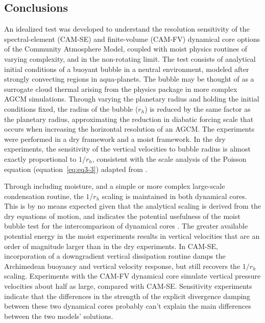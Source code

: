 \subsection{Conclusions}
An idealized test was developed to understand the resolution sensitivity of the spectral-element (CAM-SE) and finite-volume (CAM-FV) dynamical core options of the Community Atmosphere Model, coupled with moist physics routines of varying complexity, and in the non-rotating limit. The test consists of analytical initial conditions of a buoyant bubble in a neutral environment, modeled after strongly convecting regions in aqua-planets. The bubble may be thought of as a surrogate cloud thermal arising from the physics package in more complex AGCM simulations. Through varying the planetary radius and holding the initial conditions fixed, the radius of the bubble ($r_h$) is reduced by the same factor as the planetary radius, approximating the reduction in diabatic forcing scale that occurs when increasing the horizontal resolution of an AGCM. The experiments were performed in a dry framework and a moist framework. In the dry experiments, the sensitivity of the vertical velocities to bubble radius is almost exactly proportional to $1/r_h$, consistent with the scale analysis of the Poisson equation (equation~\ref{eq:eq3-3}) adapted from \cite{JR2016QJRMS}.

Through including moisture, and a simple or more complex large-scale condensation routine, the $1/r_h$ scaling is maintained in both dynamical cores. This is by no means expected given that the analytical scaling is derived from the dry equations of motion, and indicates the potential usefulness of the moist bubble test for the intercomparison of dynamical cores \citep[e.g.,][]{RJ2012JAMES}. The greater available potential energy in the moist experiments results in vertical velocities that are an order of magnitude larger than in the dry experiments. In CAM-SE, incorporation of a downgradient vertical dissipation routine damps the Archimedean buoyancy and vertical velocity response, but still recovers the $1/r_h$ scaling. Experiments with the CAM-FV dynamical core simulate vertical pressure velocities about half as large, compared with CAM-SE. Sensitivity experiments indicate that the differences in the strength of the explicit divergence damping between these two dynamical cores probably can’t explain the main differences between the two models’ solutions.

